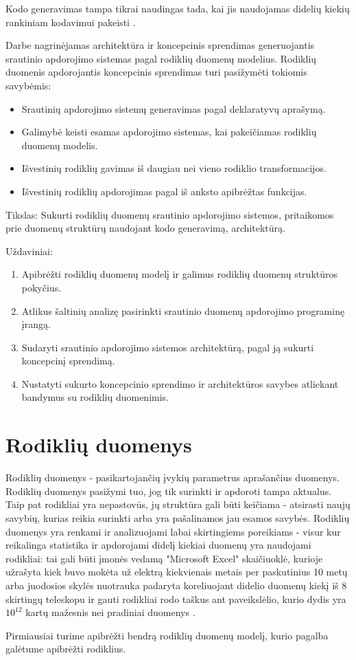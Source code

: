\documentclass{VUMIFPSbakalaurinis}
\begin{document}
Kodo generavimas tampa tikrai naudingas tada, kai jis naudojamas didelių kiekių rankiniam kodavimui pakeisti \cite{herrington2003code}. \par
Darbe nagrinėjamas architektūra ir koncepcinis sprendimas generuojantis srautinio apdorojimo sistemas pagal rodiklių duomenų modelius. Rodiklių duomenis apdorojantis koncepcinis sprendimas turi pasižymėti tokiomis savybėmis: 
\begin{itemize}
    \item Srautinių apdorojimo sistemų generavimas pagal deklaratyvų aprašymą.
    \item Galimybė keisti esamas apdorojimo sistemas, kai pakeičiamas rodiklių duomenų modelis.
    \item Išvestinių rodiklių gavimas iš daugiau nei vieno rodiklio transformacijos.
    \item Išvestinių rodiklių apdorojimas pagal iš anksto apibrėžtas funkcijas.
\end{itemize}  

Tikslas: Sukurti rodiklių duomenų srautinio apdorojimo sistemos, pritaikomos prie duomenų struktūrų naudojant kodo generavimą, architektūrą.

Uždaviniai:
\begin{enumerate}
    \item Apibrėžti rodiklių duomenų modelį ir galimus rodiklių duomenų struktūros pokyčius.
    \item Atlikus šaltinių analizę pasirinkti srautinio duomenų apdorojimo programinę įrangą.
    \item Sudaryti srautinio apdorojimo sistemos architektūrą, pagal ją sukurti koncepcinį sprendimą. 
    \item Nustatyti sukurto koncepcinio sprendimo ir architektūros savybes atliekant bandymus su rodiklių duomenimis.
\end{enumerate}

\section{Rodiklių duomenys}

Rodiklių duomenys - pasikartojančių įvykių parametrus aprašančius duomenys. Rodiklių duomenys pasižymi tuo, jog tik surinkti ir apdoroti tampa aktualus. Taip pat rodikliai yra nepastovūs, jų struktūra gali būti keičiama - atsirasti naujų savybių, kurias reikia surinkti arba yra pašalinamos jau esamos savybės. Rodiklių duomenys yra renkami ir analizuojami labai skirtingiems poreikiams - visur kur reikalinga statistika ir apdorojami didelį kiekiai duomenų yra naudojami rodikliai: tai gali būti įmonės vedamą "Microsoft Excel" skaičiuoklė, kurioje užrašyta kiek buvo mokėta už elektrą kiekvienais metais per paskutinius 10 metų arba juodosios skylės nuotrauka padaryta koreliuojant didelio duomenų kiekį iš 8 skirtingų teleskopu ir gauti rodikliai rodo taškus ant paveikslėlio, kurio dydis yra \(10^{12}\) kartų mažesnis nei pradiniai duomenys \cite{akiyama2019first}. \par    
Pirmiausiai turime apibrėžti bendrą rodiklių duomenų modelį, kurio pagalba galėtume apibrėžti rodiklius. 
\end{document}
